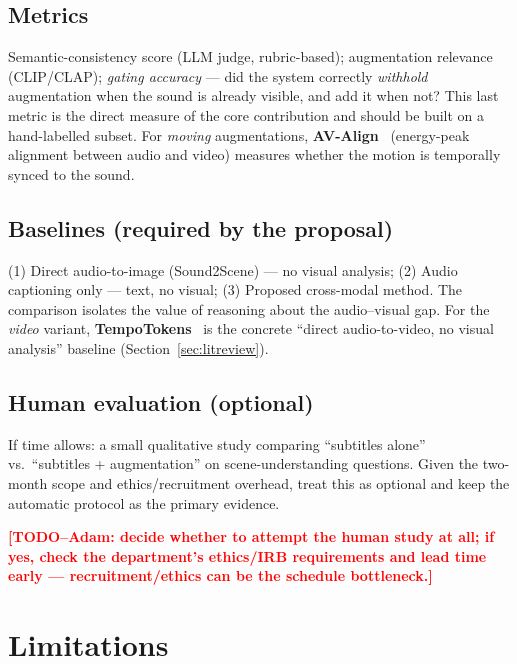 \documentclass[11pt,a4paper]{article}
\newcommand{\TODO}[1]{\textcolor{red}{\textbf{[TODO--Adam: #1]}}}
\begin{document}
\subsection{Metrics}
Semantic-consistency score (LLM judge, rubric-based); augmentation relevance (CLIP/CLAP);
\emph{gating accuracy} --- did the system correctly \emph{withhold} augmentation when the sound is
already visible, and add it when not? This last metric is the direct measure of the core
contribution and should be built on a hand-labelled subset. For \emph{moving} augmentations,
\textbf{AV-Align}~\cite{tempotokens} (energy-peak alignment between audio and video) measures whether
the motion is temporally synced to the sound.

\subsection{Baselines (required by the proposal)}
(1) Direct audio-to-image (Sound2Scene) --- no visual analysis; (2) Audio captioning only --- text,
no visual; (3) Proposed cross-modal method. The comparison isolates the value of reasoning about the
audio--visual gap. For the \emph{video} variant, \textbf{TempoTokens}~\cite{tempotokens} is the
concrete ``direct audio-to-video, no visual analysis'' baseline (Section~\ref{sec:litreview}).

\subsection{Human evaluation (optional)}
If time allows: a small qualitative study comparing ``subtitles alone'' vs.\ ``subtitles +
augmentation'' on scene-understanding questions. Given the two-month scope and ethics/recruitment
overhead, treat this as optional and keep the automatic protocol as the primary evidence.
\smallskip

\noindent\TODO{decide whether to attempt the human study at all; if yes, check the department's
ethics/IRB requirements and lead time early --- recruitment/ethics can be the schedule bottleneck.}

\section{Limitations}\label{sec:limitations}
\end{document}
